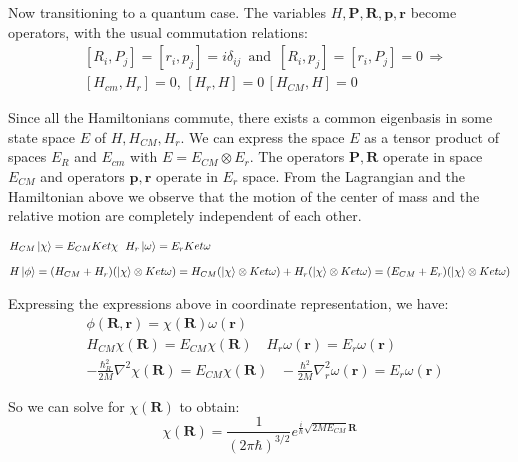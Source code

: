 Now transitioning to a quantum case. The variables $ H, \mathbf{P}, \mathbf{R}, \mathbf{p}, \mathbf{r} $ become operators, with the usual commutation relations:
\begin{equation}
\begin{split}
& [R_i, P_j] = [r_i,p_j] = i\delta_{ij}\,\text{ and }\,[R_i, p_j] = [r_i,P_j] = 0 \,\Longrightarrow \\[.8em]
& [H_{cm},H_r] = 0,\,[H_r,H] = 0\,[H_{CM},H] = 0
\end{split}
\end{equation}

Since all the Hamiltonians commute, there exists a common eigenbasis in some state space $ E $ of $ H,H_{CM}, H_r $. We can express the space $ E $ as a tensor product of spaces $ E_R $ and $ E_{cm} $ with $ E = E_{CM} \otimes E_r $. The operators $ \mathbf{P}, \mathbf{R} $ operate in space $ E_{CM} $ and operators $ \mathbf{p}, \mathbf{r} $ operate in $ E_r $ space. From the Lagrangian and the Hamiltonian above we observe that the motion of the center of mass and the relative motion are completely independent of each other.

\begin{equation}
\begin{split}
& H_{CM}\Ket{\chi} = E_{CM}Ket{\chi}\,\,\,\,H_{r}\Ket{\omega} = E_{r}Ket{\omega}\\[.8em]
& H\Ket{\phi} = (H_{CM} + H_{r})(\Ket{\chi} \otimes Ket{\omega}) = H_{CM}(\Ket{\chi} \otimes Ket{\omega}) + H_{r}(\Ket{\chi} \otimes Ket{\omega}) = (E_{CM} + E_{r})(\Ket{\chi} \otimes Ket{\omega})
\end{split}
\end{equation}

Expressing the expressions above in coordinate representation, we have:
\begin{equation}
\begin{split}
& \phi(\mathbf{R},\mathbf{r}) = \chi(\mathbf{R})\omega(\mathbf{r}) \\[.8em]
& H_{CM}\chi(\mathbf{R}) = E_{CM}\chi(\mathbf{R})\,\,\,\,\,\,H_r\omega(\mathbf{r}) = E_r\omega(\mathbf{r}) \\[.8em]
& -\frac{\hbar_R^2}{2M}\nabla^2\chi(\mathbf{R}) =  E_{CM}\chi(\mathbf{R})\,\,\,\,\,-\frac{\hbar^2}{2M}\nabla_r^2\omega(\mathbf{r}) =  E_{r}\omega(\mathbf{r})
\end{split}
\end{equation}

So we can solve for $ \chi(\mathbf{R}) $ to obtain:
\begin{equation}
\chi(\mathbf{R}) = \frac{1}{(2\pi\hbar)^{3/2}}e^{\frac{i}{\hbar}\sqrt{2ME_{CM}}\mathbf{R}}
\end{equation}


